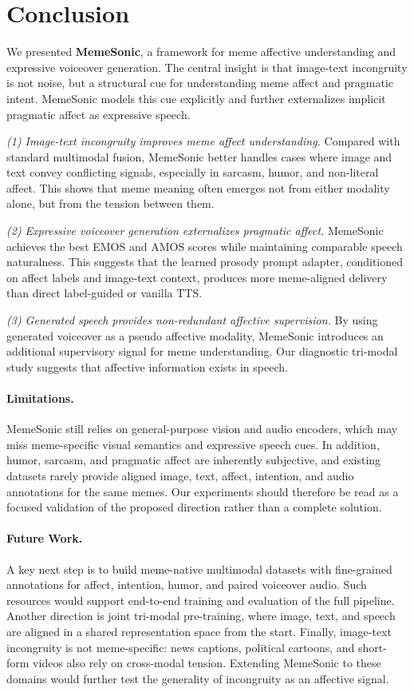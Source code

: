 


\section{Conclusion}

We presented \textbf{MemeSonic}, a framework for meme affective understanding and expressive voiceover generation. The central insight is that image-text incongruity is not noise, but a structural cue for understanding meme affect and pragmatic intent. MemeSonic models this cue explicitly and further externalizes implicit pragmatic affect as expressive speech.

\emph{(1) Image-text incongruity improves meme affect understanding.}
Compared with standard multimodal fusion, MemeSonic better handles cases where image and text convey conflicting signals, especially in sarcasm, humor, and non-literal affect. This shows that meme meaning often emerges not from either modality alone, but from the tension between them.

\emph{(2) Expressive voiceover generation externalizes pragmatic affect.}
MemeSonic achieves the best EMOS and AMOS scores while maintaining comparable speech naturalness. This suggests that the learned prosody prompt adapter, conditioned on affect labels and image-text context, produces more meme-aligned delivery than direct label-guided or vanilla TTS.

\emph{(3) Generated speech provides non-redundant affective supervision.}
By using generated voiceover as a pseudo affective modality, MemeSonic introduces an additional supervisory signal for meme understanding. Our diagnostic tri-modal study suggests that affective information exists in speech.

\paragraph{Limitations.}
MemeSonic still relies on general-purpose vision and audio encoders, which may miss meme-specific visual semantics and expressive speech cues. In addition, humor, sarcasm, and pragmatic affect are inherently subjective, and existing datasets rarely provide aligned image, text, affect, intention, and audio annotations for the same memes. Our experiments should therefore be read as a focused validation of the proposed direction rather than a complete solution.

\paragraph{Future Work.}
A key next step is to build meme-native multimodal datasets with fine-grained annotations for affect, intention, humor, and paired voiceover audio. Such resources would support end-to-end training and evaluation of the full pipeline. Another direction is joint tri-modal pre-training, where image, text, and speech are aligned in a shared representation space from the start. Finally, image-text incongruity is not meme-specific: news captions, political cartoons, and short-form videos also rely on cross-modal tension. Extending MemeSonic to these domains would further test the generality of incongruity as an affective signal.